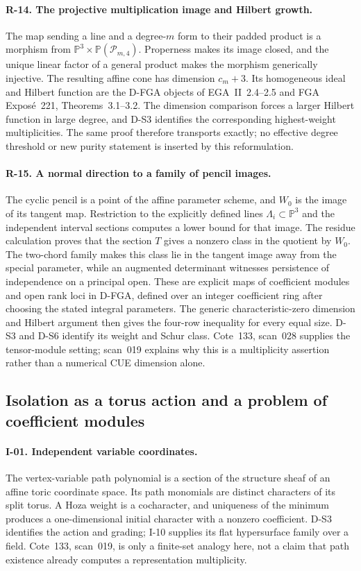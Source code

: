 \documentclass[11pt,a4paper]{article}
\theoremstyle{definition}\newtheorem{definition}{Definition}
\begin{document}
\paragraph{R-14. The projective multiplication image and Hilbert growth.}
The map sending a line and a degree-$m$ form to their padded product is a morphism from $\mathbb P^3\times\mathbb P(\mathcal P_{m,4})$. Properness makes its image closed, and the unique linear factor of a general product makes the morphism generically injective. The resulting affine cone has dimension $c_m+3$. Its homogeneous ideal and Hilbert function are the D-FGA objects of EGA~II~2.4--2.5 and FGA Expos\'e~221, Theorems~3.1--3.2. The dimension comparison forces a larger Hilbert function in large degree, and D-S3 identifies the corresponding highest-weight multiplicities. The same proof therefore transports exactly; no effective degree threshold or new purity statement is inserted by this reformulation.

\paragraph{R-15. A normal direction to a family of pencil images.}
The cyclic pencil is a point of the affine parameter scheme, and $W_0$ is the image of its tangent map. Restriction to the explicitly defined lines $\Lambda_i\subset\mathbb P^3$ and the independent interval sections computes a lower bound for that image. The residue calculation proves that the section $T$ gives a nonzero class in the quotient by $W_0$. The two-chord family makes this class lie in the tangent image away from the special parameter, while an augmented determinant witnesses persistence of independence on a principal open. These are explicit maps of coefficient modules and open rank loci in D-FGA, defined over an integer coefficient ring after choosing the stated integral parameters. The generic characteristic-zero dimension and Hilbert argument then gives the four-row inequality for every equal size. D-S3 and D-S6 identify its weight and Schur class. Cote~133, scan~028 supplies the tensor-module setting; scan~019 explains why this is a multiplicity assertion rather than a numerical CUE dimension alone.

\subsection{Isolation as a torus action and a problem of coefficient modules}

\paragraph{I-01. Independent variable coordinates.}
The vertex-variable path polynomial is a section of the structure sheaf of an affine toric coordinate space. Its path monomials are distinct characters of its split torus. A Hoza weight is a cocharacter, and uniqueness of the minimum produces a one-dimensional initial character with a nonzero coefficient. D-S3 identifies the action and grading; I-10 supplies its flat hypersurface family over a field. Cote~133, scan~019, is only a finite-set analogy here, not a claim that path existence already computes a representation multiplicity.
\end{document}
